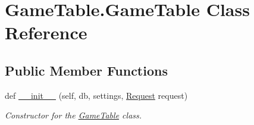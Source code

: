 \hypertarget{class_game_table_1_1_game_table}{}\section{Game\+Table.\+Game\+Table Class Reference}
\label{class_game_table_1_1_game_table}
\subsection*{Public Member Functions}
\begin{DoxyCompactItemize}
\item 
def \mbox{\hyperlink{class_game_table_1_1_game_table_aac82c184a78a56e743d0b0abf1f8d310}{\+\_\+\+\_\+init\+\_\+\+\_\+}} (self, db, settings, \mbox{\hyperlink{class_request}{Request}} request)
\begin{DoxyCompactList}\small\item\em Constructor for the \mbox{\hyperlink{class_game_table_1_1_game_table}{Game\+Table}} class. \end{DoxyCompactList}\end{DoxyCompactItemize}
